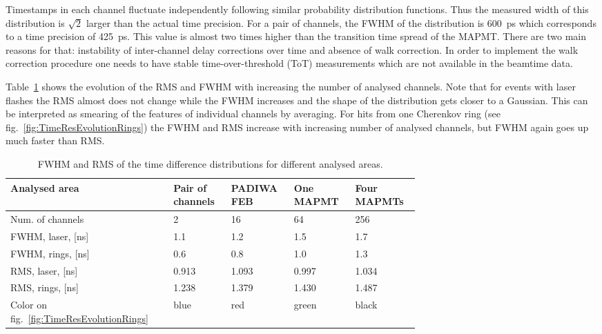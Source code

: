 \documentclass{JACoW-GSI-2015}
\begin{document}
Timestamps in each channel fluctuate independently following similar probability distribution functions. Thus the measured width of this distribution is $\sqrt 2$ larger than the actual time precision. For a pair of channels, the FWHM of the distribution is 600~ps which corresponds to a time precision of 425~ps. This value is almost two times higher than the transition time spread of the MAPMT. There are two main reasons for that: instability of inter-channel delay corrections over time and absence of walk correction. In order to implement the walk correction procedure one needs to have stable time-over-threshold (ToT) measurements which are not available in the beamtime data.



Table~\ref{tabl:EvolutionParams} shows the evolution of the RMS and FWHM with increasing the number of analysed channels. Note that for events with laser flashes the RMS almost does not change while the FWHM increases and the shape of the distribution gets closer to a Gaussian. This can be interpreted as smearing of the features of individual channels by averaging. For hits from one Cherenkov ring (see fig.~\ref{fig:TimeResEvolutionRings}) the FWHM and RMS increase with increasing number of analysed channels, but FWHM again goes up much faster than RMS.

\begin{table}[tbh]
\caption{FWHM and RMS of the time difference distributions for different analysed areas.}
\label{tabl:EvolutionParams}
\begin{tabular}{ | p{0.25\linewidth} | p{0.11\linewidth} | p{0.11\linewidth} | p{0.11\linewidth} | p{0.11\linewidth} | }
	\hline
	\scriptsize{Analysed area} & \scriptsize{Pair of channels} & \scriptsize{PADIWA FEB} & \scriptsize{One MAPMT} & \scriptsize{Four MAPMTs} \\
	\hline
	\scriptsize{Num. of channels} & 2 & 16 & 64 & 256 \\
	\hline
	\scriptsize{FWHM, laser, [ns]} & 1.1 & 1.2 & 1.5 & 1.7 \\
	\hline
	\scriptsize{FWHM, rings, [ns]} & 0.6 & 0.8 & 1.0 & 1.3 \\
	\hline
	\scriptsize{RMS, laser, [ns]} & 0.913 & 1.093 & 0.997 & 1.034 \\
	\hline
	\scriptsize{RMS, rings, [ns]} & 1.238 & 1.379 & 1.430 & 1.487 \\
	\hline
	\scriptsize{Color on fig.~\ref{fig:TimeResEvolutionRings}} & blue & red & green & black \\
	\hline
\end{tabular}
\end{table}
\end{document}
